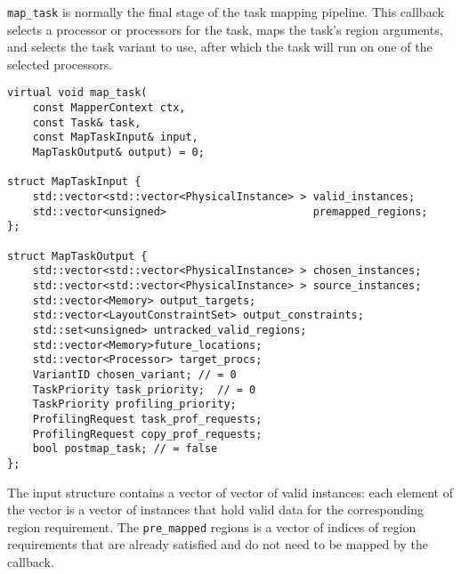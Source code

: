 {\tt map\_task} is normally the final stage of the task mapping pipeline.  This callback selects a processor or processors for the task, maps the task's region arguments, and selects the task variant to use, after which the task will run on one of the selected processors.
\begin{lstlisting}
virtual void map_task(
    const MapperContext ctx,
    const Task& task,
    const MapTaskInput& input,
    MapTaskOutput& output) = 0;

struct MapTaskInput {
    std::vector<std::vector<PhysicalInstance> > valid_instances;
    std::vector<unsigned>                       premapped_regions;
};

struct MapTaskOutput {
    std::vector<std::vector<PhysicalInstance> > chosen_instances; 
    std::vector<std::vector<PhysicalInstance> > source_instances;
    std::vector<Memory> output_targets;
    std::vector<LayoutConstraintSet> output_constraints;
    std::set<unsigned> untracked_valid_regions;
    std::vector<Memory>future_locations;
    std::vector<Processor> target_procs;
    VariantID chosen_variant; // = 0 
    TaskPriority task_priority;  // = 0
    TaskPriority profiling_priority;
    ProfilingRequest task_prof_requests;
    ProfilingRequest copy_prof_requests;
    bool postmap_task; // = false
};
\end{lstlisting}
The input structure contains a vector of vector of valid instances: each element of the vector is a vector of instances that
hold valid data for the corresponding region requirement.  The {\tt pre\_mapped} regions is a vector of indices of region
requirements that are already satisfied and do not need to be mapped by the callback.

